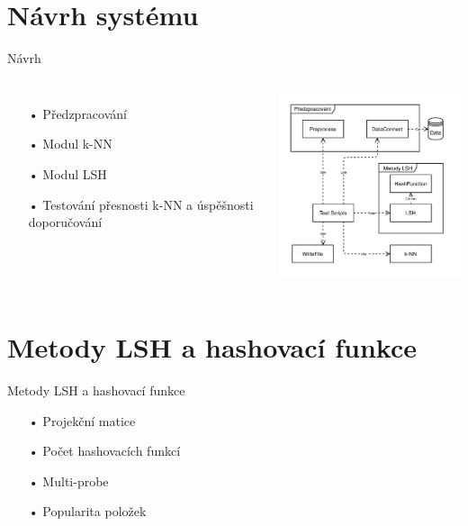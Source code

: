 \documentclass[aspectratio=169,28pt]{beamer}
\begin{document}
\section{Návrh systému}
\begin{frame}{Návrh}
\begin{columns}[c]
    \column{7cm}
      \begin{itemize}
		\item[•] Předzpracování
		\item[•] Modul k-NN
		\item[•] Modul LSH
		\item[•] Testování přesnosti k-NN a úspěšnosti doporučování 
		\end{itemize}
    \column{8cm}
      \center\includegraphics[width=7cm]{img/schemaBP}
  \end{columns}
		
\end{frame}

\section{Metody LSH a hashovací funkce}
\begin{frame}{Metody LSH a hashovací funkce}
		\begin{itemize}
		\item[•] Projekční matice
		\item[•] Počet hashovacích funkcí
		\item[•] Multi-probe
		\item[•] Popularita položek  
		\end{itemize}
\end{frame}
\end{document}
